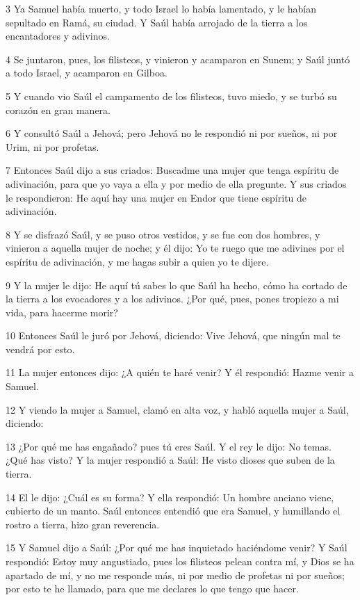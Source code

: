\par 3 Ya Samuel había muerto, y todo Israel lo había lamentado, y le habían sepultado en Ramá, su ciudad. Y Saúl había arrojado de la tierra a los encantadores y adivinos. 
\par 4 Se juntaron, pues, los filisteos, y vinieron y acamparon en Sunem; y Saúl juntó a todo Israel, y acamparon en Gilboa.
\par 5 Y cuando vio Saúl el campamento de los filisteos, tuvo miedo, y se turbó su corazón en gran manera.
\par 6 Y consultó Saúl a Jehová; pero Jehová no le respondió ni por sueños, ni por Urim, ni por profetas.
\par 7 Entonces Saúl dijo a sus criados: Buscadme una mujer que tenga espíritu de adivinación, para que yo vaya a ella y por medio de ella pregunte. Y sus criados le respondieron: He aquí hay una mujer en Endor que tiene espíritu de adivinación.
\par 8 Y se disfrazó Saúl, y se puso otros vestidos, y se fue con dos hombres, y vinieron a aquella mujer de noche; y él dijo: Yo te ruego que me adivines por el espíritu de adivinación, y me hagas subir a quien yo te dijere.
\par 9 Y la mujer le dijo: He aquí tú sabes lo que Saúl ha hecho, cómo ha cortado de la tierra a los evocadores y a los adivinos. ¿Por qué, pues, pones tropiezo a mi vida, para hacerme morir?
\par 10 Entonces Saúl le juró por Jehová, diciendo: Vive Jehová, que ningún mal te vendrá por esto.
\par 11 La mujer entonces dijo: ¿A quién te haré venir? Y él respondió: Hazme venir a Samuel.
\par 12 Y viendo la mujer a Samuel, clamó en alta voz, y habló aquella mujer a Saúl, diciendo: 
\par 13 ¿Por qué me has engañado? pues tú eres Saúl. Y el rey le dijo: No temas. ¿Qué has visto? Y la mujer respondió a Saúl: He visto dioses que suben de la tierra.
\par 14 El le dijo: ¿Cuál es su forma? Y ella respondió: Un hombre anciano viene, cubierto de un manto. Saúl entonces entendió que era Samuel, y humillando el rostro a tierra, hizo gran reverencia.
\par 15 Y Samuel dijo a Saúl: ¿Por qué me has inquietado haciéndome venir? Y Saúl respondió: Estoy muy angustiado, pues los filisteos pelean contra mí, y Dios se ha apartado de mí, y no me responde más, ni por medio de profetas ni por sueños; por esto te he llamado, para que me declares lo que tengo que hacer.
